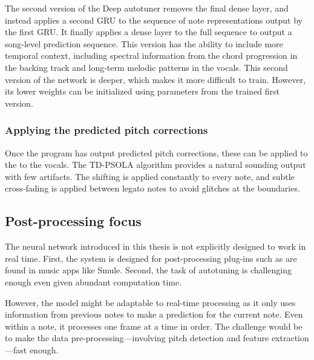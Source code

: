 The second version of the Deep autotuner removes the final dense layer, and instead applies a second GRU to the sequence of note representations output by the first GRU. It finally applies a dense layer to the full sequence to output a song-level prediction sequence. This version has the ability to include more temporal context, including spectral information from the chord progression in the backing track and long-term melodic patterns in the vocals. This second version of the network is deeper, which makes it more difficult to train. However, its lower weights can be initialized using parameters from the trained first version.

\subsubsection{Applying the predicted pitch corrections}
Once the program has output predicted pitch corrections, these can be applied to the to the vocals. The TD-PSOLA algorithm provides a natural sounding output with few artifacts. The shifting is applied constantly to every note, and subtle cross-fading is applied between legato notes to avoid glitches at the boundaries.

\subsection{Post-processing focus}
The neural network introduced in this thesis is not explicitly designed to work in real time. First, the system is designed for post-processing plug-ins such as are found in music apps like Smule. Second, the task of autotuning is challenging enough even given abundant computation time. 

However, the model might be adaptable to real-time processing as it only uses information from previous notes to make a prediction for the current note. Even within a note, it processes one frame at a time in order. The challenge would be to make the data pre-processing---involving pitch detection and feature extraction---fast enough. 

